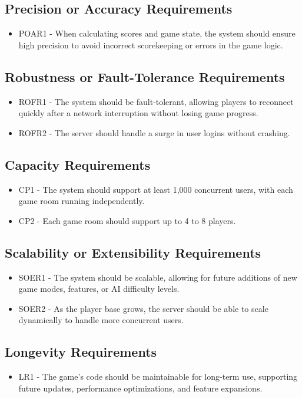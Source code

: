 \documentclass[12pt]{article}
\begin{document}
\subsection{Precision or Accuracy Requirements}
\begin{itemize}
    \item POAR1 - When calculating scores and game state, the system should ensure high precision to avoid incorrect scorekeeping or errors in the game logic.
\end{itemize}

\subsection{Robustness or Fault-Tolerance Requirements}
\begin{itemize}
    \item ROFR1 - The system should be fault-tolerant, allowing players to reconnect quickly after a network interruption without losing game progress.
    \item ROFR2 - The server should handle a surge in user logins without crashing.
\end{itemize}

\subsection{Capacity Requirements}
\begin{itemize}
    \item CP1 - The system should support at least 1,000 concurrent users, with each game room running independently.
    \item CP2 - Each game room should support up to 4 to 8 players.
\end{itemize}

\subsection{Scalability or Extensibility Requirements}
\begin{itemize}
    \item SOER1 - The system should be scalable, allowing for future additions of new game modes, features, or AI difficulty levels.
    \item SOER2 - As the player base grows, the server should be able to scale dynamically to handle more concurrent users.
\end{itemize}

\subsection{Longevity Requirements}
\begin{itemize}
    \item LR1 - The game’s code should be maintainable for long-term use, supporting future updates, performance optimizations, and feature expansions.
\end{itemize}
\end{document}
